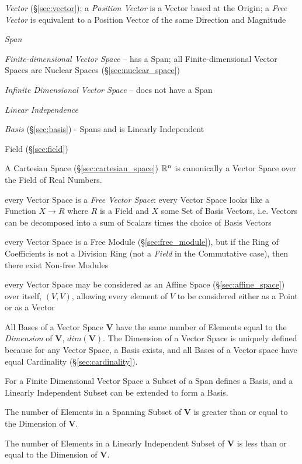 \emph{Vector} (\S\ref{sec:vector}); a \emph{Position Vector} is a Vector based
at the Origin; a \emph{Free Vector} is equivalent to a Position Vector of the
same Direction and Magnitude

\emph{Span}

\emph{Finite-dimensional Vector Space} -- has a Span; all
Finite-dimensional Vector Spaces are Nuclear Spaces
(\S\ref{sec:nuclear_space})

\emph{Infinite Dimensional Vector Space} -- does not have a Span

\emph{Linear Independence}

\emph{Basis} (\S\ref{sec:basis}) - Spans and is Linearly Independent

Field (\S\ref{sec:field})

A Cartesian Space (\S\ref{sec:cartesian_space}) $\mathbb{R}^n$ is canonically a
Vector Space over the Field of Real Numbers.

every Vector Space is a \emph{Free Vector Space}: every Vector Space
looks like a Function $X \rightarrow R$ where $R$ is a Field and $X$
some Set of Basis Vectors, i.e. Vectors can be decomposed into a sum
of Scalars times the choice of Basis Vectors %

every Vector Space is a Free Module (\S\ref{sec:free_module}), but if the Ring
of Coefficients is not a Division Ring (not a \emph{Field} in the Commutative
case), then there exist Non-free Modules

every Vector Space may be considered as an Affine Space
(\S\ref{sec:affine_space}) over itself, $(V,V)$, allowing every element of $V$
to be considered either as a Point or as a Vector

All Bases of a Vector Space $\mathbf{V}$ have the same number of
Elements equal to the \emph{Dimension} of $\mathbf{V}$,
$dim(\mathbf{V})$. The Dimension of a Vector Space is uniquely defined
because for any Vector Space, a Basis exists, and all Bases of a
Vector space have equal Cardinality (\S\ref{sec:cardinality}).

For a Finite Dimensional Vector Space a Subset of a Span defines a
Basis, and a Linearly Independent Subset can be extended to form a
Basis.

The number of Elements in a Spanning Subset of $\mathbf{V}$ is greater
than or equal to the Dimension of $\mathbf{V}$.

The number of Elements in a Linearly Independent Subset of
$\mathbf{V}$ is less than or equal to the Dimension of $\mathbf{V}$.

